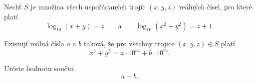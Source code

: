 \documentclass[12pt,a4paper]{article}
\begin{document}
\begin{exercise}
    Nechť $S$ je množina všech uspořádaných trojic $(x,y,z)$ reálných čísel, pro které platí
    \[
        \log_{10}(x + y) = z
        \qquad\text{a}\qquad
        \log_{10}(x^{2} + y^{2}) = z + 1.
    \]

    Existují reálná čísla $a$ a $b$ taková, že pro všechny trojice $(x,y,z) \in S$ platí
    \[
        x^{3} + y^{3} = a \cdot 10^{3z} + b \cdot 10^{2z}.
    \]

    Určete hodnotu součtu
    \[
        a + b.
    \]
\end{exercise}
\end{document}
